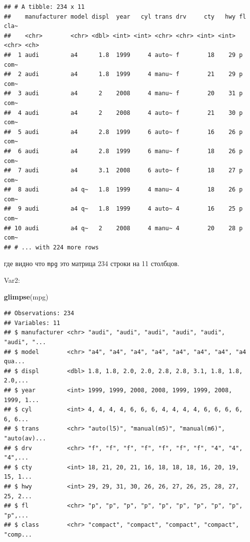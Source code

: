 \documentclass[]{book}
\newenvironment{Shaded}{\begin{snugshade}}{\end{snugshade}}
\newcommand{\KeywordTok}[1]{\textcolor[rgb]{0.13,0.29,0.53}{\textbf{#1}}}
\newcommand{\NormalTok}[1]{#1}
\begin{document}
\begin{verbatim}
## # A tibble: 234 x 11
##    manufacturer model displ  year   cyl trans drv     cty   hwy fl    cla~
##    <chr>        <chr> <dbl> <int> <int> <chr> <chr> <int> <int> <chr> <ch>
##  1 audi         a4      1.8  1999     4 auto~ f        18    29 p     com~
##  2 audi         a4      1.8  1999     4 manu~ f        21    29 p     com~
##  3 audi         a4      2    2008     4 manu~ f        20    31 p     com~
##  4 audi         a4      2    2008     4 auto~ f        21    30 p     com~
##  5 audi         a4      2.8  1999     6 auto~ f        16    26 p     com~
##  6 audi         a4      2.8  1999     6 manu~ f        18    26 p     com~
##  7 audi         a4      3.1  2008     6 auto~ f        18    27 p     com~
##  8 audi         a4 q~   1.8  1999     4 manu~ 4        18    26 p     com~
##  9 audi         a4 q~   1.8  1999     4 auto~ 4        16    25 p     com~
## 10 audi         a4 q~   2    2008     4 manu~ 4        20    28 p     com~
## # ... with 224 more rows
\end{verbatim}

где видно что \texttt{mpg} это матрица 234 строки на 11 столбцов.

Var2:

\begin{Shaded}
\begin{Highlighting}[]
\KeywordTok{glimpse}\NormalTok{(mpg)}
\end{Highlighting}
\end{Shaded}

\begin{verbatim}
## Observations: 234
## Variables: 11
## $ manufacturer <chr> "audi", "audi", "audi", "audi", "audi", "audi", "...
## $ model        <chr> "a4", "a4", "a4", "a4", "a4", "a4", "a4", "a4 qua...
## $ displ        <dbl> 1.8, 1.8, 2.0, 2.0, 2.8, 2.8, 3.1, 1.8, 1.8, 2.0,...
## $ year         <int> 1999, 1999, 2008, 2008, 1999, 1999, 2008, 1999, 1...
## $ cyl          <int> 4, 4, 4, 4, 6, 6, 6, 4, 4, 4, 4, 6, 6, 6, 6, 6, 6...
## $ trans        <chr> "auto(l5)", "manual(m5)", "manual(m6)", "auto(av)...
## $ drv          <chr> "f", "f", "f", "f", "f", "f", "f", "4", "4", "4",...
## $ cty          <int> 18, 21, 20, 21, 16, 18, 18, 18, 16, 20, 19, 15, 1...
## $ hwy          <int> 29, 29, 31, 30, 26, 26, 27, 26, 25, 28, 27, 25, 2...
## $ fl           <chr> "p", "p", "p", "p", "p", "p", "p", "p", "p", "p",...
## $ class        <chr> "compact", "compact", "compact", "compact", "comp...
\end{verbatim}
\end{document}
